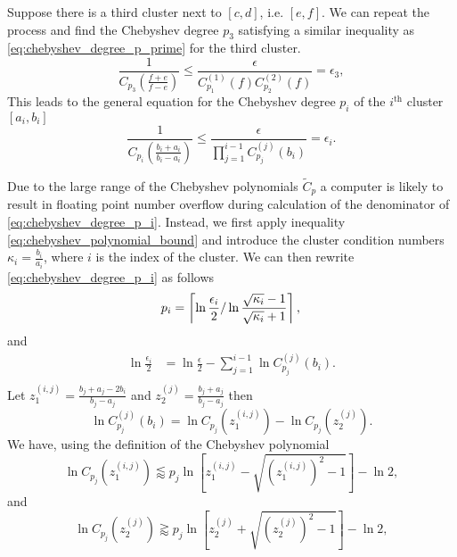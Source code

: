 Suppose there is a third cluster next to $[c,d]$, i.e. $[e,f]$. We can repeat the process and find the Chebyshev degree $p_3$ satisfying a similar inequality as \ref{eq:chebyshev_degree_p_prime} for the third cluster. 
\[
    \frac{1}{C_{p_3}\left(\frac{f+e}{f-e}\right)} \leq \frac{\epsilon}{C^{(1)}_{p_1}(f)C^{(2)}_{p_2}(f)} = \epsilon_3,
\]
This leads to the general equation for the Chebyshev degree $p_i$ of the $i^{\text{th}}$ cluster $[a_i, b_i]$
\begin{equation}
    \frac{1}{C_{p_i}\left(\frac{b_i + a_i}{b_i - a_i}\right)} \leq \frac{\epsilon}{\prod_{j=1}^{i-1} C^{(j)}_{p_j}(b_i)} = \epsilon_i.
    \label{eq:chebyshev_degree_p_i}
\end{equation}

Due to the large range of the Chebyshev polynomials $\tilde{C}_p$ a computer is likely to result in floating point number overflow during calculation of the denominator of \cref{eq:chebyshev_degree_p_i}. Instead, we first apply inequality \ref{eq:chebyshev_polynomial_bound} and introduce the cluster condition numbers $\kappa_i = \frac{b_i}{a_i}$, where $i$ is the index of the cluster. We can then rewrite \cref{eq:chebyshev_degree_p_i} as follows
\begin{equation*}
    p_i  =  \left\lceil\ln{\frac{\epsilon_i}{2}} / \ln{\frac{\sqrt{\kappa_i} - 1}{\sqrt{\kappa_i} + 1}}\right\rceil, \\
\end{equation*}
and
\begin{align*}
    \ln{\frac{\epsilon_i}{2}} & = \ln{\frac{\epsilon}{2}} - \sum_{j=1}^{i-1} \ln{C^{(j)}_{p_j}(b_i)}. \\
\end{align*}
Let $z^{(i,j)}_1 = \frac{b_j + a_j - 2b_i}{b_j - a_j}$ and $z^{(j)}_2 = \frac{b_j + a_j}{b_j - a_j}$ then
\begin{equation*}
    \ln{C^{(j)}_{p_j}(b_i)} = \ln{C_{p_j}(z^{(i,j)}_1)} - \ln{C_{p_j}(z^{(j)}_2)}.
\end{equation*}
We have, using the definition of the Chebyshev polynomial
\begin{equation}
    \ln{C_{p_j}(z^{(i,j)}_1)} \lessapprox p_j \ln{\left[z^{(i,j)}_1 - \sqrt{\left(z^{(i,j)}_1\right)^2 - 1}\right]} - \ln{2},
    \label{eq:chebyshev_polynomial_bound_z1}
\end{equation}
and
\begin{equation}
    \ln{C_{p_j}(z^{(j)}_2)} \gtrapprox p_j \ln{\left[z^{(j)}_2 + \sqrt{\left(z^{(j)}_2\right)^2 - 1}\right]} - \ln{2},
    \label{eq:chebyshev_polynomial_bound_z2}
\end{equation}
